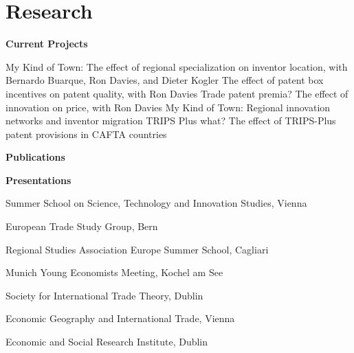 \documentclass[letterpaper]{article}
\renewenvironment{itemize}{
  \begin{list}{}{
    \setlength{\leftmargin}{1.5em}
  }
}{
  \end{list}
}
\begin{document}
\section*{Research}
\begin{itemize}
\item {\bf Current Projects}

\leftskip 0.5in
\parindent -0.5in
\subitem My Kind of Town: The effect of regional specialization on inventor location, with Bernardo Buarque, Ron Davies, and Dieter Kogler
\subitem The effect of patent box incentives on patent quality, with Ron Davies
\subitem Trade patent premia? The effect of innovation on price, with Ron Davies
\subitem My Kind of Town: Regional innovation networks and inventor migration
\subitem TRIPS Plus what? The effect of TRIPS-Plus patent provisions in CAFTA countries
\\


\leftskip 0in
\item {\bf Publications}
\leftskip 0.5in
\parindent -0.5in

\leftskip 0.5in
\parindent -0.5in

\leftskip 0in

\pagebreak

\item {\bf Presentations}
\begin{itemize}
\item{Summer School on Science, Technology and Innovation Studies, Vienna}
\item{European Trade Study Group, Bern}
\item{Regional Studies Association Europe Summer School, Cagliari}
\item{Munich Young Economists Meeting, Kochel am See}
\item{Society for International Trade Theory, Dublin}
\item{Economic Geography and International Trade, Vienna}
\end{itemize}
\begin{itemize}
\item{Economic and Social Research Institute, Dublin}
\end{itemize}
\leftskip 0.5in
\parindent -0.5in

\end{itemize}
\end{document}

